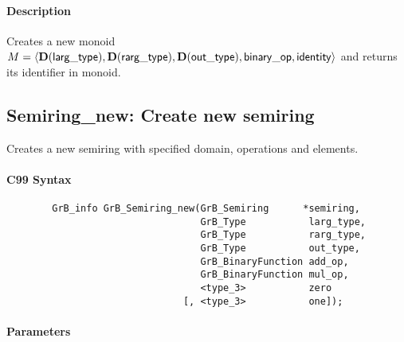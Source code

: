 \paragraph{Description}

Creates a new monoid $M = \langle \bold{D}({\sf larg\_type}), \bold{D}({\sf rarg\_type}), 
\bold{D}({\sf out\_type}), {\sf binary\_op}, {\sf identity} \rangle$ and
returns its identifier in {\sf monoid}.


\subsection{{\sf Semiring\_new}: Create new semiring}

Creates a new semiring with specified domain, operations and elements.

\paragraph{C99 Syntax}

\begin{verbatim}
        GrB_info GrB_Semiring_new(GrB_Semiring      *semiring,
                                  GrB_Type           larg_type,
                                  GrB_Type           rarg_type,
                                  GrB_Type           out_type,
                                  GrB_BinaryFunction add_op,
                                  GrB_BinaryFunction mul_op,
                                  <type_3>           zero
                               [, <type_3>           one]);
\end{verbatim}

\paragraph{Parameters}

